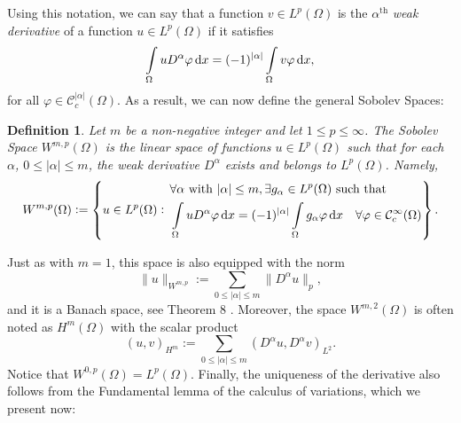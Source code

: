 \documentclass[a4paper,doc,11pt]{article}
\newtheorem{definition}[theorem]{Definition}
\newcommand{\CC}{\mathcal{C}}
\begin{document}
Using this notation, we can say that a function \( v \in L^{p}(\Omega)\) is the \( \alpha^\text{th}\) \emph{weak derivative} of a function \(u \in L^p(\Omega)\) if it satisfies
\[
    \int\limits_\Omega u D^\alpha \varphi \dif x = (-1)^{|\alpha|} \int\limits_\Omega v \varphi \dif x,
\]
for all \(\varphi \in \CC_c^{|\alpha|} (\Omega)\). As a result, we can now define the general Sobolev Spaces:

\begin{definition}
Let \(m\) be a non-negative integer and let \( 1\leq p \leq \infty\). The Sobolev Space \(W^{m,p} (\Omega)\) is the linear space of functions \( u \in L^p (\Omega)\) such that for each \(\alpha\), \(0 \leq |\alpha| \leq m\), the weak derivative \(D^\alpha\) exists and belongs to \(L^p (\Omega)\). Namely,
\[
    W^{m,p} (\Omega) :=
    \left\{
        u \in L^p (\Omega): \,
        \begin{aligned}
        &\forall \alpha \text{ with } |\alpha| \leq m, \exists g_{\alpha} \in L^p (\Omega) \text{ such that } 
        \\
        &\int\limits_\Omega u D^\alpha \varphi \dif x = (-1)^{|\alpha|}\int\limits_\Omega g_\alpha \varphi \dif x \quad \forall \varphi \in \CC_c^\infty (\Omega)
        \end{aligned}
    \right\}.
\]
\end{definition}

Just as with \(m = 1\), this space is also equipped with the norm
\[
    \|u\|_{W^{m,p}} :=  \sum_{0\leq |\alpha| \leq m} \| D^\alpha u \|_p,
\]
and it is a Banach space, see Theorem 8 \citep{Ball2019}. Moreover, the space \(W^{m,2}(\Omega)\) is often noted as \(H^m (\Omega)\) with the scalar product
\[
    (u,v)_{H^m} := \sum_{0\leq |\alpha| \leq m}  (D^\alpha u, D^\alpha v)_{L^2}.
\]
Notice that \(W^{0,p} (\Omega) = L^p (\Omega)\). Finally, the uniqueness of the derivative also follows from the Fundamental lemma of the calculus of variations, which we present now:
\end{document}
